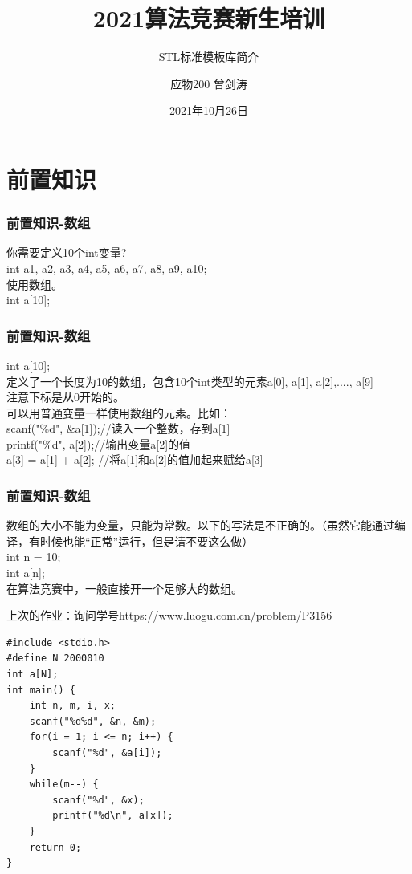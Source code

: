 \documentclass{beamer}
\title{2021算法竞赛新生培训}
\subtitle{STL标准模板库简介}
\author{应物200 曾剑涛}
\date{2021年10月26日}
\begin{document}
    \maketitle

    \section{前置知识}
    \begin{frame}
        \frametitle{前置知识-数组}
        你需要定义10个int变量?\\
        int a1, a2, a3, a4, a5, a6, a7, a8, a9, a10;\\
        使用数组。\\
        int a[10];\\

    \end{frame}

    \begin{frame}
        \frametitle{前置知识-数组}
        int a[10];\\
        定义了一个长度为10的数组，包含10个int类型的元素a[0], a[1], a[2],...., a[9]\\
        注意下标是从0开始的。\\
        可以用普通变量一样使用数组的元素。比如：\\
        scanf("\%d", \&a[1]);//读入一个整数，存到a[1] \\
        printf("\%d", a[2]);//输出变量a[2]的值 \\
        a[3] = a[1] + a[2]; //将a[1]和a[2]的值加起来赋给a[3]\\
    
        
    
    \end{frame}

    \begin{frame}
        \frametitle{前置知识-数组}
    
        数组的大小不能为变量，只能为常数。以下的写法是不正确的。（虽然它能通过编译，有时候也能“正常”运行，但是请不要这么做）\\ 
        int n = 10;\\
        int a[n];\\
        在算法竞赛中，一般直接开一个足够大的数组。\\

    
    \end{frame}


    上次的作业：询问学号https://www.luogu.com.cn/problem/P3156
    \begin{lstlisting}
#include <stdio.h>
#define N 2000010
int a[N];
int main() {
    int n, m, i, x;
    scanf("%d%d", &n, &m);
    for(i = 1; i <= n; i++) {
        scanf("%d", &a[i]);
    }
    while(m--) {
        scanf("%d", &x);
        printf("%d\n", a[x]);
    }
    return 0;
}
    \end{lstlisting}
\end{document}
